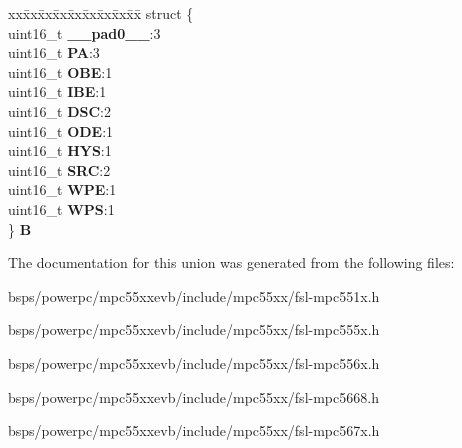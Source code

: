 \begin{DoxyCompactItemize}
\begin{tabbing}
\end{tabbing}\item 
\mbox{\label{unionSIU__tag_1_1SIU__PCR__tag_ae3314b5d360d9b3854d63e8fc2c75642}} 
\begin{tabbing}
xx\=xx\=xx\=xx\=xx\=xx\=xx\=xx\=xx\=\kill
struct \{\\
\>uint16\_t {\bfseries \_\_pad0\_\_}:3\\
\>uint16\_t {\bfseries PA}:3\\
\>uint16\_t {\bfseries OBE}:1\\
\>uint16\_t {\bfseries IBE}:1\\
\>uint16\_t {\bfseries DSC}:2\\
\>uint16\_t {\bfseries ODE}:1\\
\>uint16\_t {\bfseries HYS}:1\\
\>uint16\_t {\bfseries SRC}:2\\
\>uint16\_t {\bfseries WPE}:1\\
\>uint16\_t {\bfseries WPS}:1\\
\} {\bfseries B}\\

\end{tabbing}\end{DoxyCompactItemize}


The documentation for this union was generated from the following files\+:\begin{DoxyCompactItemize}
\item 
bsps/powerpc/mpc55xxevb/include/mpc55xx/fsl-\/mpc551x.\+h\item 
bsps/powerpc/mpc55xxevb/include/mpc55xx/fsl-\/mpc555x.\+h\item 
bsps/powerpc/mpc55xxevb/include/mpc55xx/fsl-\/mpc556x.\+h\item 
bsps/powerpc/mpc55xxevb/include/mpc55xx/fsl-\/mpc5668.\+h\item 
bsps/powerpc/mpc55xxevb/include/mpc55xx/fsl-\/mpc567x.\+h\end{DoxyCompactItemize}
